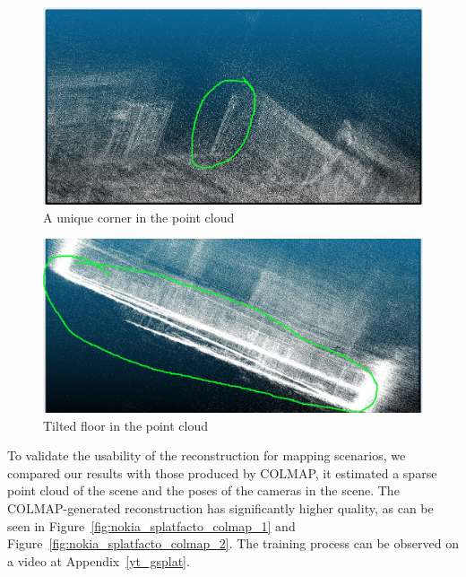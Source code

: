 \begin{figure}[htbp]
	\centering
	\includegraphics[width=150mm, keepaspectratio]{figures_jpg/pointcloud_debug.jpg}
	\caption{A unique corner in the point cloud}
	\label{fig:pointcloud_debug}
\end{figure}

\begin{figure}[htbp]
	\centering
	\includegraphics[width=150mm, keepaspectratio]{figures_jpg/pointcloud_debug1.jpg}
	\caption{Tilted floor in the point cloud}
	\label{fig:pointcloud_debug1}
\end{figure}


To validate the usability of the reconstruction for mapping scenarios, we compared our results with those produced by COLMAP, it estimated a sparse point cloud of the scene and the poses of the cameras in the scene. The COLMAP-generated reconstruction has significantly higher quality, as can be seen in Figure~\ref{fig:nokia_splatfacto_colmap_1} and Figure~\ref{fig:nokia_splatfacto_colmap_2}. The training process can be observed on a video at Appendix~\ref{yt_gsplat}.

